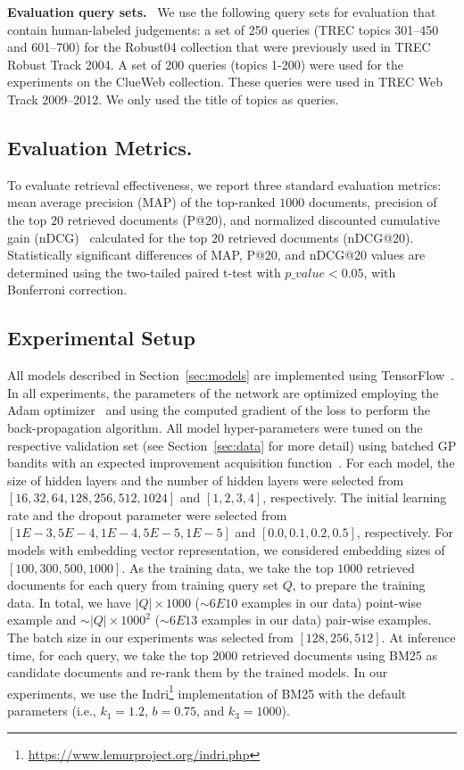 \documentclass[sigconf]{acmart}
\newcommand{\feedthree}{embedding vector representation\xspace}
\newcommand{\sshrink}{\vspace{-.80ex}}
\newcommand{\mypar}[1]{\vspace*{-0.1ex}\medskip\noindent\textbf{#1}~}
\begin{document}
\mypar{Evaluation query sets.} 
We use the following query sets for evaluation that contain human-labeled judgements: a set of 250 queries (TREC topics 301--450 and 601--700) for the Robust04 collection that were previously used in TREC Robust Track 2004. A set of 200 queries (topics 1-200) were used for the experiments on the ClueWeb collection. These queries were used in TREC Web Track 2009--2012. We only used the title of topics as queries.



\subsection{Evaluation Metrics.}
To evaluate retrieval effectiveness, we report three standard evaluation metrics: mean average precision (MAP) of the top-ranked $1000$ documents, precision of the top $20$ retrieved documents (P@20), and normalized discounted cumulative gain (nDCG)~\citep{Jarvelin:2002} calculated for the top $20$ retrieved documents (nDCG@20). Statistically significant differences of MAP, P@20, and nDCG@20 values are determined using the two-tailed paired t-test with $p\_value<0.05$, with Bonferroni correction.
 

\sshrink
\subsection{Experimental Setup}
All models described in Section~\ref{sec:models} are implemented using TensorFlow~\citep{tang2016:tflearn,tensorflow2015-whitepaper}.
In all experiments, the parameters of the network are optimized employing the Adam optimizer~\citep{Kingma:2014} and using the computed gradient of the loss to perform the back-propagation algorithm.
All model hyper-parameters were tuned on the respective validation set (see Section~\ref{sec:data} for more detail) using batched GP bandits with an expected improvement acquisition function~\citep{Desautels:2014}. 
For each model, the size of hidden layers and the number of hidden layers were selected from $[16, 32, 64, 128, 256, 512, 1024]$ and $[1, 2, 3, 4]$, respectively. The initial learning rate and the dropout parameter were selected from $[1E-3, 5E-4, 1E-4, 5E-5, 1E-5]$ and $[0.0, 0.1, 0.2, 0.5]$, respectively. For models with \feedthree, we considered embedding sizes of $[100, 300, 500, 1000]$. As the training data, we take the top $1000$ retrieved documents for each query from training query set $Q$, to prepare the training data. In total, we have $|Q|\times 1000$ ($\sim6E10$ examples in our data) point-wise example and $\sim|Q|\times 1000^2$ ($\sim6E13$ examples in our data) pair-wise examples. The batch size in our experiments was selected from  $[128, 256, 512]$.
%
At inference time, for each query, we take the top $2000$ retrieved documents using BM25 as candidate documents and re-rank them by the trained models. In our experiments, we use the Indri\footnote{\url{https://www.lemurproject.org/indri.php}} implementation of BM25 with the default parameters (i.e., $k_1 = 1.2$, $b = 0.75$, and $k_3 = 1000$).
\end{document}
